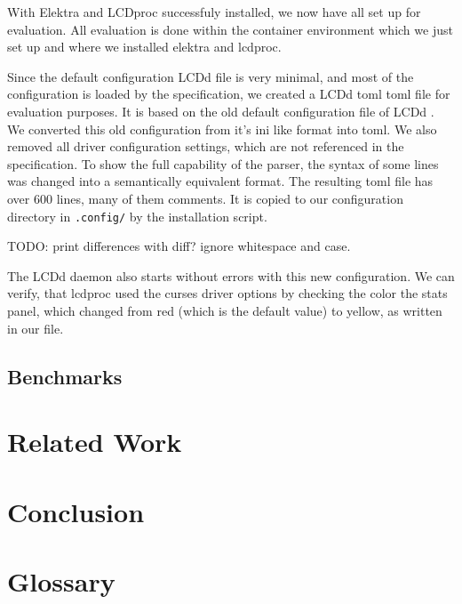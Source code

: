 \documentclass[12pt]{report}
\begin{document}
With Elektra and LCDproc successfuly installed, we now have all set up for evaluation.
All evaluation is done within the container environment which we just set up and where we installed elektra and lcdproc.

Since the default configuration LCDd file is very minimal, and most of the configuration is loaded by the specification, we created a LCDd \acrshort{toml} toml file for evaluation purposes.
It is based on the old default configuration file of LCDd \cite{lcdprocconf}.
We converted this old configuration from it's ini like format into \acrshort{toml}.
We also removed all driver configuration settings, which are not referenced in the specification.
To show the full capability of the parser, the syntax of some lines was changed into a semantically equivalent format.
The resulting \acrshort{toml} file has over 600 lines, many of them comments.
It is copied to our configuration directory in \texttt{.config/} by the installation script.

TODO: print differences with diff? ignore whitespace and case.

The LCDd daemon also starts without errors with this new configuration.
We can verify, that lcdproc used the curses driver options by checking the color the stats panel, which changed from red (which is the default value) to yellow, as written in our file.

\section{Benchmarks}


\chapter{Related Work}

\chapter{Conclusion}

\chapter{Glossary}

\printglossary[type=\acronymtype]

{}

\end{document}
